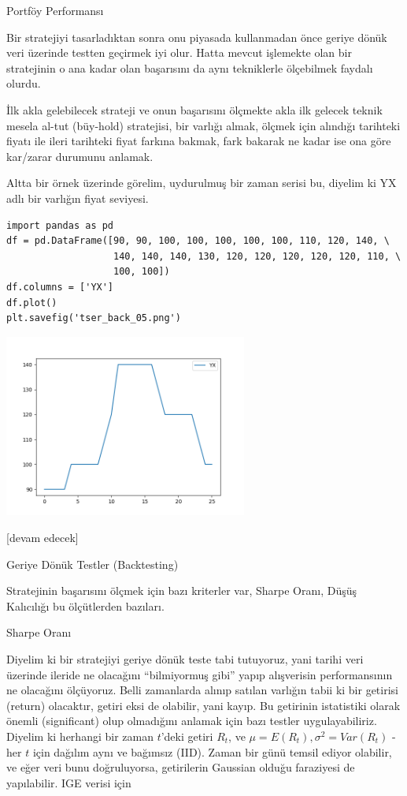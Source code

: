 \documentclass[12pt,fleqn]{article}\usepackage{../../common}
\begin{document}
Portföy Performansı

Bir stratejiyi tasarladıktan sonra onu piyasada kullanmadan önce geriye dönük
veri üzerinde testten geçirmek iyi olur. Hatta mevcut işlemekte olan bir
stratejinin o ana kadar olan başarısını da aynı tekniklerle ölçebilmek
faydalı olurdu.

İlk akla gelebilecek strateji ve onun başarısını ölçmekte akla ilk gelecek
teknik mesela al-tut (büy-hold) stratejisi, bir varlığı almak, ölçmek için
alındığı tarihteki fiyatı ile ileri tarihteki fiyat farkına bakmak, fark bakarak
ne kadar ise ona göre kar/zarar durumunu anlamak.

Altta bir örnek üzerinde görelim, uydurulmuş bir zaman serisi bu, diyelim ki
YX adlı bir varlığın fiyat seviyesi.

\begin{verbatim}
import pandas as pd
df = pd.DataFrame([90, 90, 100, 100, 100, 100, 100, 110, 120, 140, \
                   140, 140, 140, 130, 120, 120, 120, 120, 120, 110, \
                   100, 100])
df.columns = ['YX']
df.plot()
plt.savefig('tser_back_05.png')
\end{verbatim}

\includegraphics[height=6cm]{tser_back_05.png}





[devam edecek]

Geriye Dönük Testler (Backtesting)

Stratejinin başarısını ölçmek için bazı kriterler var, Sharpe Oranı, Düşüş
Kalıcılığı bu ölçütlerden bazıları.

Sharpe Oranı 

Diyelim ki bir stratejiyi geriye dönük teste tabi tutuyoruz, yani tarihi veri
üzerinde ileride ne olacağını ``bilmiyormuş gibi'' yapıp alışverisin
performansının ne olacağını ölçüyoruz. Belli zamanlarda alınıp satılan varlığın
tabii ki bir getirisi (return) olacaktır, getiri eksi de olabilir, yani
kayıp. Bu getirinin istatistiki olarak önemli (significant) olup olmadığını
anlamak için bazı testler uygulayabiliriz. Diyelim ki herhangi bir zaman
$t$'deki getiri $R_t$, ve $\mu = E(R_t), \sigma^2=Var(R_t)$ - her $t$ için
dağılım aynı ve bağımsız (IID). Zaman bir günü temsil ediyor olabilir, ve eğer
veri bunu doğruluyorsa, getirilerin Gaussian olduğu faraziyesi de
yapılabilir. IGE verisi için
\end{document}
